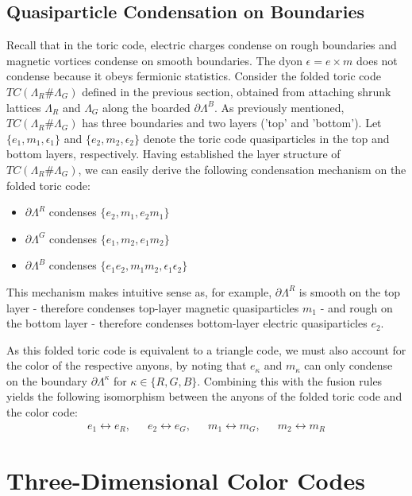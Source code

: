 \documentclass[12pt]{article}
\theoremstyle{definition}
\begin{document}
\subsection{Quasiparticle Condensation on Boundaries}
Recall that in the toric code, electric charges condense on rough boundaries and magnetic vortices condense on smooth boundaries. The dyon $\epsilon = e\times m$ does not condense because it obeys fermionic statistics. Consider the folded toric code $TC(\Lambda_R\#\Lambda_G)$ defined in the previous section, obtained from attaching shrunk lattices $\Lambda_R$ and $\Lambda_G$ along the boarded $\partial\Lambda^B$. As previously mentioned, $TC(\Lambda_R\#\Lambda_G)$ has three boundaries and two layers ('top' and 'bottom'). Let $\{e_1,m_1,\epsilon_1\}$ and $\{e_2,m_2,\epsilon_2\}$ denote the toric code quasiparticles in the top and bottom layers, respectively. Having established the layer structure of $TC(\Lambda_R\#\Lambda_G)$, we can easily derive the following condensation mechanism on the folded toric code:
    \begin{itemize}
        \item $\partial\Lambda^R$ condenses $\{e_2,m_1,e_2m_1\}$
        \item $\partial\Lambda^G$ condenses $\{e_1,m_2,e_1m_2\}$
        \item $\partial\Lambda^B$ condenses $\{e_1e_2,m_1m_2,\epsilon_1\epsilon_2\}$
    \end{itemize}
This mechanism makes intuitive sense as, for example, $\partial\Lambda^R$ is smooth on the top layer - therefore condenses top-layer magnetic quasiparticles $m_1$ - and rough on the bottom layer - therefore condenses bottom-layer electric quasiparticles $e_2$.\newline

As this folded toric code is equivalent to a triangle code, we must also account for the color of the respective anyons, by noting that $e_\kappa$ and $m_\kappa$ can only condense on the boundary $\partial\Lambda^\kappa$ for $\kappa\in\{R,G,B\}$. Combining this with the fusion rules yields the following isomorphism between the anyons of the folded toric code and the color code:
    \begin{align}
        e_1\leftrightarrow e_R,\enspace\enspace\enspace e_2\leftrightarrow e_G,\enspace\enspace\enspace m_1\leftrightarrow m_G,\enspace\enspace\enspace m_2\leftrightarrow m_R
    \end{align}

\newpage\section{Three-Dimensional Color Codes}
\end{document}
